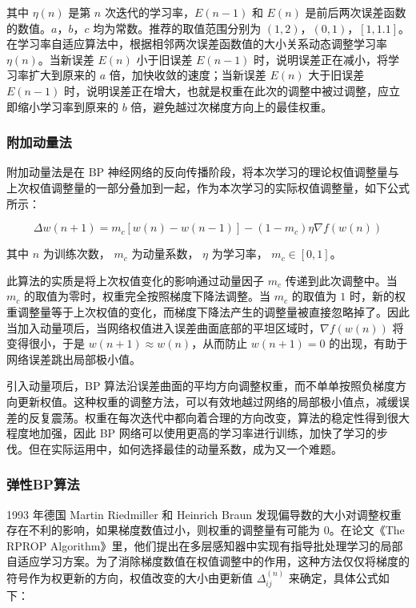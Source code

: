 \documentclass[UTF8]{ctexart}
\begin{document}
其中 $\eta(n)$ 是第 $n$ 次迭代的学习率，$E(n-1)$ 和 $E(n)$ 是前后两次误差函数的数值。$a$，$b$，$c$ 均为常数。推荐的取值范围分别为 $(1,2)$，$(0,1)$，$[1,1.1]$。在学习率自适应算法中，根据相邻两次误差函数值的大小关系动态调整学习率 $\eta(n)$。当新误差 $E(n)$ 小于旧误差 $E(n-1)$ 时，说明误差正在减小，将学习率扩大到原来的 $a$ 倍，加快收敛的速度；当新误差 $E(n)$ 大于旧误差 $E(n-1)$ 时，说明误差正在增大，也就是权重在此次的调整中被过调整，应立即缩小学习率到原来的 $b$ 倍，避免越过次梯度方向上的最佳权重。

\subsubsection{附加动量法}

附加动量法是在 BP 神经网络的反向传播阶段，将本次学习的理论权值调整量与上次权值调整量的一部分叠加到一起，作为本次学习的实际权值调整量，如下公式所示： \par

\begin{equation}
\Delta w(n+1) = m_c[w(n) - w(n-1)] - (1-m_c) \eta \nabla f(w(n))
\end{equation}

其中 $n$ 为训练次数， $m_c$ 为动量系数， $\eta$ 为学习率， $m_c \in [0,1]$。 \par

此算法的实质是将上次权值变化的影响通过动量因子 $m_c$ 传递到此次调整中。当 $m_c$ 的取值为零时，权重完全按照梯度下降法调整。当 $m_c$ 的取值为 $1$ 时，新的权重调整量等于上次权值的变化，而梯度下降法产生的调整量被直接忽略掉了。因此当加入动量项后，当网络权值进入误差曲面底部的平坦区域时，$\nabla f(w(n))$ 将变得很小，于是 $w(n+1) \approx w(n)$，从而防止 $w(n+1) = 0$ 的出现，有助于网络误差跳出局部极小值。\par

引入动量项后，BP 算法沿误差曲面的平均方向调整权重，而不单单按照负梯度方向更新权值。这种权重的调整方法，可以有效地越过网络的局部极小值点，减缓误差的反复震荡。权重在每次迭代中都向着合理的方向改变，算法的稳定性得到很大程度地加强，因此 BP 网络可以使用更高的学习率进行训练，加快了学习的步伐。但在实际运用中，如何选择最佳的动量系数，成为又一个难题。 

\subsubsection{弹性BP算法}

1993 年德国 Martin  Riedmiller 和 Heinrich  Braun 发现偏导数的大小对调整权重存在不利的影响，如果梯度数值过小，则权重的调整量有可能为 $0$。在论文《The RPROP Algorithm》里，他们提出在多层感知器中实现有指导批处理学习的局部自适应学习方案。为了消除梯度数值在权值调整中的作用，这种方法仅仅将梯度的符号作为权更新的方向，权值改变的大小由更新值 $\Delta_{ij}^{(n)}$ 来确定，具体公式如下：
\end{document}
